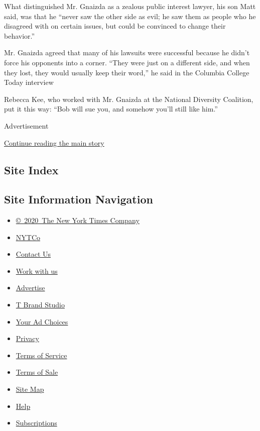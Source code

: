 What distinguished Mr. Gnaizda as a zealous public interest lawyer, his
son Matt said, was that he ``never saw the other side as evil; he saw
them as people who he disagreed with on certain issues, but could be
convinced to change their behavior.''

Mr. Gnaizda agreed that many of his lawsuits were successful because he
didn't force his opponents into a corner. ``They were just on a
different side, and when they lost, they would usually keep their
word,'' he said in the Columbia College Today interview

Rebecca Kee, who worked with Mr. Gnaizda at the National Diversity
Coalition, put it this way: ``Bob will sue you, and somehow you'll still
like him.''

Advertisement

\protect\hyperlink{after-bottom}{Continue reading the main story}

\hypertarget{site-index}{%
\subsection{Site Index}\label{site-index}}

\hypertarget{site-information-navigation}{%
\subsection{Site Information
Navigation}\label{site-information-navigation}}

\begin{itemize}
\tightlist
\item
  \href{https://help.nytimes.com/hc/en-us/articles/115014792127-Copyright-notice}{©~2020~The
  New York Times Company}
\end{itemize}

\begin{itemize}
\tightlist
\item
  \href{https://www.nytco.com/}{NYTCo}
\item
  \href{https://help.nytimes.com/hc/en-us/articles/115015385887-Contact-Us}{Contact
  Us}
\item
  \href{https://www.nytco.com/careers/}{Work with us}
\item
  \href{https://nytmediakit.com/}{Advertise}
\item
  \href{http://www.tbrandstudio.com/}{T Brand Studio}
\item
  \href{https://www.nytimes.com/privacy/cookie-policy\#how-do-i-manage-trackers}{Your
  Ad Choices}
\item
  \href{https://www.nytimes.com/privacy}{Privacy}
\item
  \href{https://help.nytimes.com/hc/en-us/articles/115014893428-Terms-of-service}{Terms
  of Service}
\item
  \href{https://help.nytimes.com/hc/en-us/articles/115014893968-Terms-of-sale}{Terms
  of Sale}
\item
  \href{https://spiderbites.nytimes.com}{Site Map}
\item
  \href{https://help.nytimes.com/hc/en-us}{Help}
\item
  \href{https://www.nytimes.com/subscription?campaignId=37WXW}{Subscriptions}
\end{itemize}

